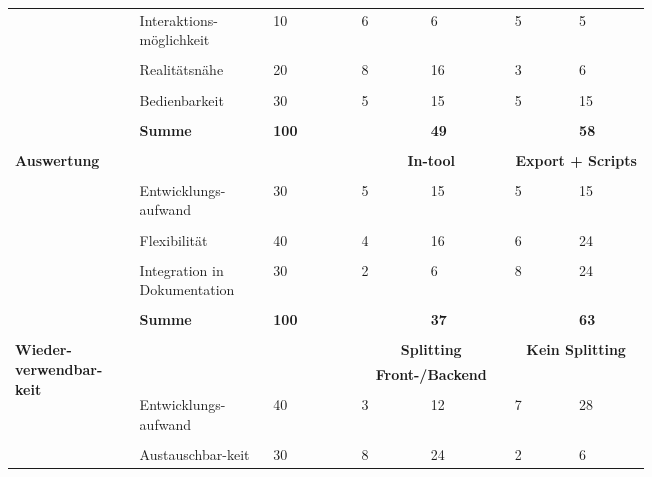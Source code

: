 \documentclass[main.tex]{subfiles} %
\begin{document}
\begin{table}[ht]
\begin{tabular}{|p{0.14\linewidth}|p{0.15\linewidth}|p{0.115\linewidth}|p{0.08\linewidth}|p{0.09\linewidth}|p{0.08\linewidth}|p{0.09\linewidth}|}
        & Interaktions-möglichkeit & 10 & 6 & 6 & 5 & 5 \\[1pt]
        \cline{2-7}
        &&&&&&\\[-9pt]
        & Realitätsnähe & 20 & 8 & 16 & 3 & 6 \\[1pt]
        \cline{2-7}
        &&&&&&\\[-9pt]
        & Bedienbarkeit & 30 & 5 & 15 & 5 & 15 \\[1pt]
        \cline{2-7}
        &&&&&&\\[-9pt]
        & \textbf{Summe} & \textbf{100} &  & \textbf{49} &  & \textbf{58} \\[1pt]
        \hline
        \hline
        & \multicolumn{2}{c|}{} & \multicolumn{2}{c|}{} & \multicolumn{2}{c|}{} \\[-9pt]
        \multirow{5}{4em}{\textbf{Auswertung}} & \multicolumn{2}{c|}{} & \multicolumn{2}{c|}{\textbf{In-tool}} & \multicolumn{2}{c|}{\textbf{Export + Scripts}} \\[1pt]
        \cline{2-7}
        &&&&&&\\[-9pt]
        & Entwicklungs-aufwand & 30 & 5 & 15 & 5 & 15 \\[1pt]
        \cline{2-7}
        &&&&&&\\[-9pt]
        & Flexibilität & 40 & 4 & 16 & 6 & 24 \\[1pt]
        \cline{2-7}
        &&&&&&\\[-9pt]
        & Integration in Dokumentation & 30 & 2 & 6 & 8 & 24 \\[1pt]
        \cline{2-7}
        &&&&&&\\[-9pt]
        & \textbf{Summe} & \textbf{100} &  & \textbf{37} &  & \textbf{63} \\[1pt]
        \hline
        \hline
        & \multicolumn{2}{c|}{} & \multicolumn{2}{c|}{} & \multicolumn{2}{c|}{} \\[-9pt]
        \multirow{6}{4em}{\textbf{Wieder-verwendbar-keit}} & \multicolumn{2}{c|}{} & \multicolumn{2}{c|}{\textbf{Splitting}} & \multicolumn{2}{c|}{\textbf{Kein Splitting}} \\[1pt]
        & \multicolumn{2}{c|}{} & \multicolumn{2}{c|}{\textbf{Front-/Backend}} & \multicolumn{2}{c|}{\textbf{}} \\[1pt]
        \cline{2-7}
        &&&&&&\\[-9pt]
        & Entwicklungs-aufwand & 40 & 3 & 12 & 7 & 28 \\[1pt]
        \cline{2-7}
        &&&&&&\\[-9pt]
        & Austauschbar-keit & 30 & 8 & 24 & 2 & 6 \\[1pt]

\end{tabular}
\end{table}
\end{document}

